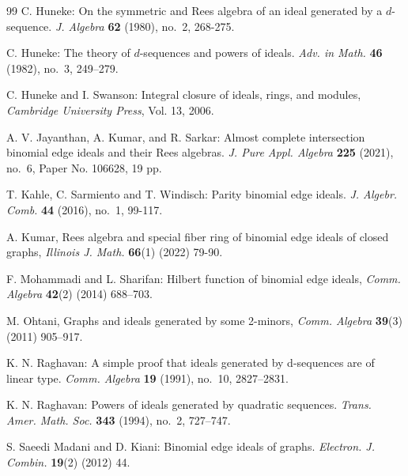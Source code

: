 \documentclass[11pt,a4paper,reqno]{amsart}
\theoremstyle{definition}
\begin{document}
\begin{thebibliography}{99}
 C. Huneke: On the symmetric and {R}ees algebra of an ideal generated by a {$d$}-sequence. \emph{J. Algebra} {\bf 62} (1980), no.~2, 268-275. 


 C. Huneke: The theory of {$d$}-sequences and powers of ideals. \emph{Adv. in Math.} {\bf 46} (1982), no.~3, 249–279.  

 C. Huneke and I. Swanson: Integral closure of ideals, rings, and modules, \emph{Cambridge University
Press}, Vol. 13, 2006. 

 A. V. Jayanthan, A. Kumar, and R. Sarkar: Almost complete intersection binomial edge ideals and their {R}ees algebras. \emph{J. Pure Appl. Algebra} {\bf 225} (2021), no.~6, Paper No. 106628, 19 pp.

 T. Kahle,  C. Sarmiento and T. Windisch: \newblock Parity binomial edge ideals. \emph{J. Algebr. Comb.} {\bf 44} (2016), no.~1, {99-117}. 


 A. Kumar, \newblock Rees algebra and special fiber ring of binomial edge ideals of closed graphs, \emph{Illinois J. Math. } {\bf 66}(1) (2022) 79-90.


 F. Mohammadi and L. Sharifan:  \newblock Hilbert function of binomial edge ideals, \emph{Comm. Algebra} {\bf 42}(2) (2014) 688–703.

 M. Ohtani, \newblock Graphs and ideals generated by some 2-minors, \emph{Comm. Algebra} {\bf 39}(3) (2011) 905–917. 


 K. N. Raghavan: \newblock A simple proof that ideals generated by d-sequences are of linear type. \emph{Comm. Algebra} {\bf 19} (1991), no.~10, 2827–2831.


 K. N. Raghavan: \newblock Powers of ideals generated by quadratic sequences. \emph{Trans. Amer. Math. Soc.} {\bf 343} (1994), no.~2, 727--747.


 S. Saeedi Madani and D. Kiani:  \newblock Binomial edge ideals of graphs. \emph{Electron. J. Combin.} {\bf 19}(2) (2012) 44. 


\end{thebibliography}
\end{document}
